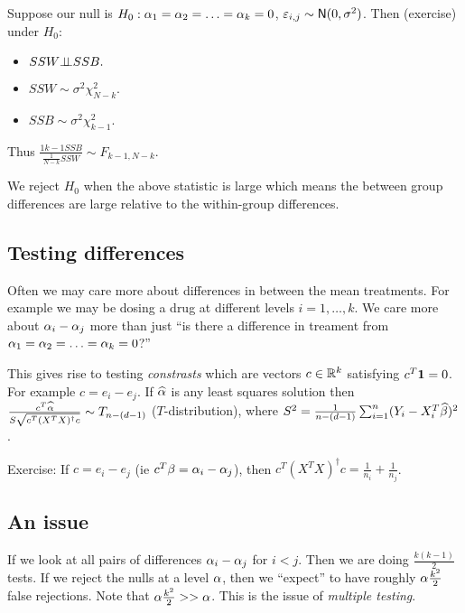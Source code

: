 Suppose our null is $H_0:{\alpha}_1={\alpha}_2=\ldots ={\alpha}_k=0$, $\varepsilon_{i,j} \sim {\mathsf{N}}(0,\sigma^2)$. Then (exercise) under $H_0$:
\begin{itemize}
    \item $SSW {\perp\!\!\!\perp} SSB.$
    \item $SSW \sim \sigma^2 \chi^2_{N-k}$.
    \item $SSB \sim \sigma^2 \chi^2_{k-1}$.
\end{itemize}
Thus $\frac{{1}{k-1}SSB}{\frac{1}{N-k}SSW} \sim F_{k-1, N-k}$.

We reject $H_0$ when the above statistic is large which means the between group differences are large relative to the within-group differences. 

\subsection{Testing differences}
Often we may care more about differences in between the mean treatments. For example we may be dosing a drug at different levels $i=1,\ldots, k$. We care more about ${\alpha}_i -{\alpha}_j$ more than just ``is there a difference in treament from ${\alpha}_1={\alpha}_2=\ldots={\alpha}_k=0$?'' 

This gives rise to testing \emph{constrasts} which are vectors $c \in {\mathbb R}^k$ satisfying $c^T {{\bf 1}} = 0$. For example $c = e_i - e_j$. If $\widehat{{\alpha}}$ is any least squares solution then $\frac{c^T \widehat{{\alpha}}}{S\sqrt{c^T(X^TX)^\dagger c}} \sim T_{n-(d-1)}$ ($T$-distribution), where $S^2 = \frac{1}{n-(d-1)}\sum_{i=1}^n (Y_i-X_i^T\widehat{\beta})^2$. 

Exercise: If $c = e_i -e_j$ (ie $c^T \beta = {\alpha}_i -{\alpha}_j$), then $c^T(X^TX)^\dagger c = \frac{1}{n_i}+\frac{1}{n_j}$. 

\subsection{An issue}
If we look at all pairs of differences ${\alpha}_i -{\alpha}_j$ for $i< j$. Then we are doing $\frac{k(k-1)}{2}$ tests. If we reject the nulls at a level ${\alpha}$, then we ``expect'' to have roughly ${\alpha} \frac{k^2}{2}$ false rejections. Note that ${\alpha} \frac{k^2}{2} >> {\alpha}$. This is the issue of \emph{multiple testing}.
